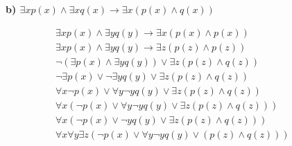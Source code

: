 \textbf{b) $\exists x p(x) \land \exists x q(x) \rightarrow \exists x (p(x) \land q(x)) $}

\begin{align*}
\exists x p(x) \land \exists y q(y) \rightarrow \exists x (p(x) \land p(x))\\
\exists x p(x) \land \exists y q(y) \rightarrow \exists z (p(z) \land p(z)) && \tag*{Renom.} \\
\lnot (\exists p (x) \land \exists y q(y)) \lor \exists z (p(z) \land q(z)) && \tag*{Rem. $\rightarrow$}  \\
\lnot \exists p (x) \lor \lnot \exists y q(y) \lor \exists z (p(z) \land q(z)) \\
\forall x \lnot p (x) \lor \forall y \lnot y q(y) \lor \exists z (p(z) \land q(z)) \\
\forall x (\lnot p (x) \lor \forall y \lnot y q(y) \lor \exists z (p(z) \land q(z))) \\
\forall x (\lnot p (x) \lor \lnot y q(y) \lor \exists z (p(z) \land q(z))) \\
\forall x \forall y \exists z (\lnot p (x) \lor \forall y \lnot y q(y) \lor (p(z) \land q(z)))
\end{align*}
